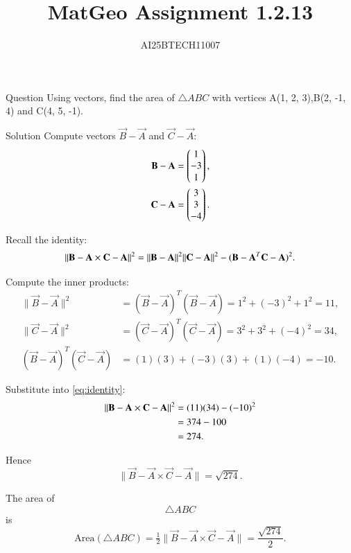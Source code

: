 \documentclass{beamer}
\title 
{MatGeo Assignment 1.2.13}
\author
{AI25BTECH11007}
\begin{document}
\frame{\titlepage}
\begin{frame}{Question}
Using vectors, find the area of $\triangle ABC$ with vertices A(1, 2, 3),B(2, -1, 4) and C(4, 5, -1).
\end{frame}
\begin{frame}{Solution}
Compute vectors $\vec{B}-\vec{A}$ and $\vec{C}-\vec{A}$:\\
 
\begin{align}
\vec{B}-\vec{A} = \myvec{1\\-3\\1}, \label{eq:AB}\\
\vec{C}-\vec{A} = \myvec{3\\3\\-4}. \label{eq:AC}
\end{align}

Recall the identity:
\begin{equation}
\|\vec{B}-\vec{A}\\ \times \vec{C}-\vec{A}\|^2
= \|\vec{B}-\vec{A}\|^2 \|\vec{C}-\vec{A}\|^2 - (\vec{B}-\vec{A}^T\vec{C}-\vec{A})^2. \label{eq:identity}
\end{equation}
\end{frame}
\begin{frame}
    

Compute the inner products:
\begin{align}
\|\vec{B}-\vec{A}\|^2 &= (\vec{B}-\vec{A})^T (\vec{B}-\vec{A}) = 1^2 + (-3)^2 + 1^2 = 11, \label{eq:ABsq}\\
\|\vec{C}-\vec{A}\|^2 &= (\vec{C}-\vec{A})^T (\vec{C}-\vec{A}) = 3^2 + 3^2 + (-4)^2 = 34, \label{eq:ACsq}\\
(\vec{B}-\vec{A})^T(\vec{C}-\vec{A}) &= (1)(3) + (-3)(3) + (1)(-4) = -10. \label{eq:dot}
\end{align}

Substitute into \eqref{eq:identity}:
\begin{align}
\|\vec{B}-\vec{A} \times \vec{C}-\vec{A}\|^2 &= (11)(34) - (-10)^2 \notag\\
&= 374 - 100 \notag\\
&= 274. \label{eq:crosssq}
\end{align}

\end{frame}
\begin{frame}
 Hence
\begin{equation}
\|\vec{B}-\vec{A}\times \vec{C}-\vec{A}\| = \sqrt{274}. \label{eq:crossnorm}
\end{equation}

 The area of $$\triangle ABC$$ is
\begin{equation}
\text{Area}(\triangle ABC) 
= \tfrac{1}{2}\|\vec{B}-\vec{A}\times\vec{C}-\vec{A}\|
= \frac{\sqrt{274}}{2}. \label{eq:area}
\end{equation}

\end{frame}
\end{document}

